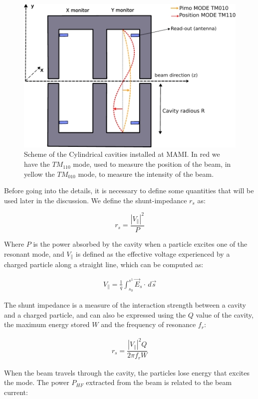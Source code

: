 \begin{figure}[!hbtp]
\centering
\includegraphics[width = 0.65 \textwidth]{ExperimentalSetup/Monitors.pdf}
\caption{Scheme of the Cylindrical cavities installed at MAMI. In red we have the $TM_{110}$ mode, used to measure the position of the beam, in yellow the $TM_{010}$ mode, to measure the intensity of the beam.}
\label{fig:CylindricMonit}
\end{figure}


Before going into the details, it is necessary to define some quantities that will be used later in the discussion. We define the shunt-impedance $r_{s}$ as:

\begin{equation}
r_{s} = \frac{|V_{\|}|^{2}}{P}
\end{equation}

Where $P$ is the power absorbed by the cavity when a particle excites one of the resonant mode, and $V_{\|}$ is defined as the effective voltage experienced by a charged particle along a straight line, which can be computed as:

\begin{align*}
V_{\|} = \frac{1}{q}  \int_{s_{0}}^{s^{1}} \vec{E}_{s} \cdot  \,d \vec{s}
\end{align*}

The shunt impedance is a measure of the interaction strength between a cavity and a charged particle, and can also be expressed using the $Q$ value of the cavity, the maximum energy stored $W$ and the frequency of resonance $f_{r}$:

\begin{align*}
r_{s} = \dfrac{|V_{\|}|^{2} Q}{2 \pi f_{r} W}
\end{align*}

When the beam travels through the cavity, the particles lose energy that excites the mode. The power $P_{HF}$ extracted from the beam is related to the beam current: 


